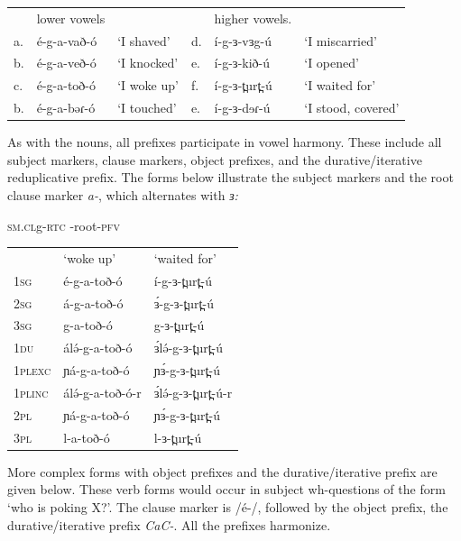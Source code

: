\ea
\begin{tabular}[t]{llllll}
&	lower vowels	&		&	& higher vowels.\\
a.&	é-g-a-vað-ó		&	‘I shaved’	&	d.	&	í-g-ɜ-vɜg-ú	&	‘I miscarried’\\
b.&	é-g-a-veð-ó		&	‘I knocked’	&	e.	&	í-g-ɜ-kið-ú	&	‘I opened’\\
c.&	é-g-a-toð-ó		&	‘I woke up’	&	f.	&	í-g-ɜ-t̪urt̪-ú&	‘I waited for’\\
b.&	é-g-a-bəɾ-ó 	&	‘I touched’	&	e.	&	í-g-ɜ-dɘɾ-ú &	‘I stood, covered’\\
\end{tabular}
\z

As with the nouns, all prefixes participate in vowel harmony. These include all subject markers, clause markers, object prefixes, and the durative/iterative reduplicative prefix. The forms below illustrate the subject markers and the root clause marker \textit{a-}, which alternates with \textit{ɜ:}

\ea \textsc{sm.cl}g-\textsc{rtc} -root-\textsc{pfv}\\
\begin{tabular}[t]{lll}
&	‘woke up’	&	‘waited for’\\
1\textsc{sg}	&	é-g-a-toð-ó	&	í-g-ɜ-t̪urt̪-ú\\
2\textsc{sg}	&	á-g-a-toð-ó	&	ɜ́-g-ɜ-t̪urt̪-ú\\
3\textsc{sg}	&	g-a-toð-ó	&	g-ɜ-t̪urt̪-ú\\
1\textsc{du}	&	álə́-g-a-toð-ó	&	ɜ́lə́-g-ɜ-t̪urt̪-ú\\
1\textsc{plexc}	&	ɲá-g-a-toð-ó	&	ɲɜ́-g-ɜ-t̪urt̪-ú\\
1\textsc{plinc}	&	álə́-g-a-toð-ó-r	&	ɜ́lə́-g-ɜ-t̪urt̪-ú-r\\
2\textsc{pl}	&	ɲá-g-a-toð-ó	&	ɲɜ́-g-ɜ-t̪urt̪-ú\\
3\textsc{pl}	&	l-a-toð-ó	&	l-ɜ-t̪urt̪-ú\\
\end{tabular}
\z

More complex forms with object prefixes and the durative/iterative prefix are given below. These verb forms would occur in subject wh-questions of the form ‘who is poking X?’. The clause marker is /é-/, followed by the object prefix, the durative/iterative prefix \textit{CaC-}. All the prefixes harmonize. 

